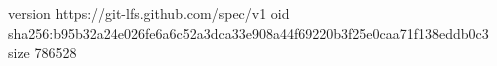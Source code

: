 version https://git-lfs.github.com/spec/v1
oid sha256:b95b32a24e026fe6a6c52a3dca33e908a44f69220b3f25e0caa71f138eddb0c3
size 786528
